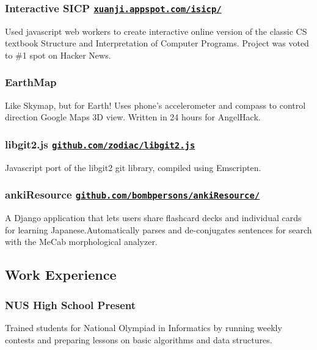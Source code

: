 \documentclass[letterpaper]{article}
\begin{document}
\subsubsection*{Interactive SICP \hfill \href{http://xuanji.appspot.com/isicp/}{\tt xuanji.appspot.com/isicp/}}
Used javascript web workers to create interactive online version of the classic CS textbook Structure and Interpretation of Computer Programs. Project was voted to \#1 spot on Hacker News.

\subsubsection*{EarthMap}
Like Skymap, but for Earth! Uses phone's accelerometer and compass to control direction Google Maps 3D view. Written in 24 hours for AngelHack.

\subsubsection*{libgit2.js \hfill \href{https://github.com/zodiac/libgit2.js}{\tt github.com/zodiac/libgit2.js}}
Javascript port of the libgit2 git library, compiled using Emscripten.

\subsubsection*{ankiResource \hfill \href{https://github.com/bombpersons/ankiResource}{\tt github.com/bombpersons/ankiResource/}}
A Django application that lets users share flashcard decks and individual cards for learning Japanese.Automatically parses and de-conjugates sentences for search with the MeCab morphological analyzer.

\vspace{1em}

\begin{center}
\section*{Work Experience}
\end{center}

\subsubsection*{NUS High School \hfill Present}
Trained students for National Olympiad in Informatics by running weekly contests and preparing lessons on basic algorithms and data structures.
\end{document}
